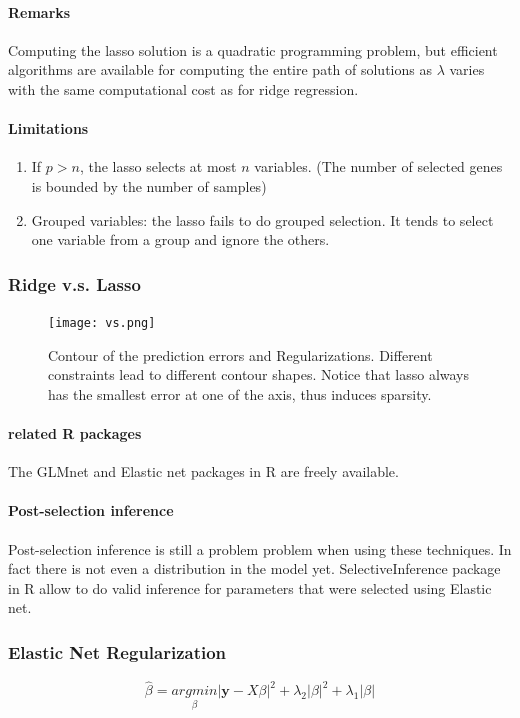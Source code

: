 \documentclass[11pt]{article}
\newcommand{\tb}[1]{\textbf{#1}}
\newcommand{\vy}[0]{\tb{y}}
\begin{document}
 \paragraph{Remarks}
 Computing the lasso solution is a quadratic programming problem, but efficient algorithms are available for computing the entire path of solutions as $\lambda$ varies with the same computational cost as for ridge regression.
 \paragraph{Limitations}
 \begin{enumerate}
 	\item If $p > n$, the lasso selects at most $n$ variables. (The number of selected genes is bounded by the number of samples)
 	\item Grouped variables: the lasso fails to do grouped selection. It tends to select one variable from a group and ignore the others.
 \end{enumerate}
 
 \subsubsection{Ridge v.s. Lasso}
  \begin{figure}[h]
	\centering
	\texttt{[image: vs.png]}
	\caption{Contour of the prediction errors and Regularizations. Different constraints lead to different contour shapes. Notice that lasso always has the smallest error at one of the axis, thus induces sparsity.}
\end{figure}

 
 \paragraph{related R packages}
 The GLMnet and Elastic net packages in R are freely available.


 \paragraph{Post-selection inference}
 Post-selection inference is still a problem problem when using these techniques. In fact there is not even a distribution in the model yet. SelectiveInference package in R allow to do valid inference for parameters that were selected using Elastic net.
 
 \subsubsection{Elastic Net Regularization}
 $$\hat{\beta} = \underset{\beta}{argmin} |\vy - X\beta|^2 + \lambda_2|\beta|^2 + \lambda_1 |\beta|$$
\end{document}
